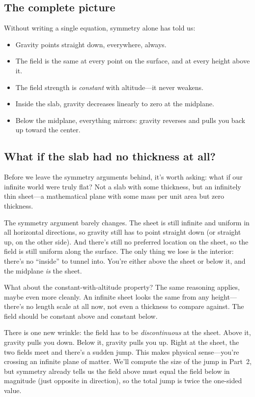 \documentclass[11pt, letterpaper]{article}
\begin{document}
\subsection{The complete picture}

Without writing a single equation, symmetry alone has told us:

\begin{itemize}[nosep]
  \item Gravity points straight down, everywhere, always.
  \item The field is the same at every point on the surface, and at every height above it.
  \item The field strength is \textit{constant} with altitude---it never weakens.
  \item Inside the slab, gravity decreases linearly to zero at the midplane.
  \item Below the midplane, everything mirrors: gravity reverses and pulls you back up toward the center.
\end{itemize}

\subsection{What if the slab had no thickness at all?}

Before we leave the symmetry arguments behind, it's worth asking: what if our infinite world were truly flat? Not a slab with some thickness, but an infinitely thin sheet---a mathematical plane with some mass per unit area but zero thickness.

The symmetry argument barely changes. The sheet is still infinite and uniform in all horizontal directions, so gravity still has to point straight down (or straight up, on the other side). And there's still no preferred location on the sheet, so the field is still uniform along the surface. The only thing we lose is the interior: there's no ``inside'' to tunnel into. You're either above the sheet or below it, and the midplane \textit{is} the sheet.

What about the constant-with-altitude property? The same reasoning applies, maybe even more cleanly. An infinite sheet looks the same from any height---there's no length scale at all now, not even a thickness to compare against. The field should be constant above and constant below.

There is one new wrinkle: the field has to be \textit{discontinuous} at the sheet. Above it, gravity pulls you down. Below it, gravity pulls you up. Right at the sheet, the two fields meet and there's a sudden jump. This makes physical sense---you're crossing an infinite plane of matter. We'll compute the size of the jump in Part~2, but symmetry already tells us the field above must equal the field below in magnitude (just opposite in direction), so the total jump is twice the one-sided value.
\end{document}
